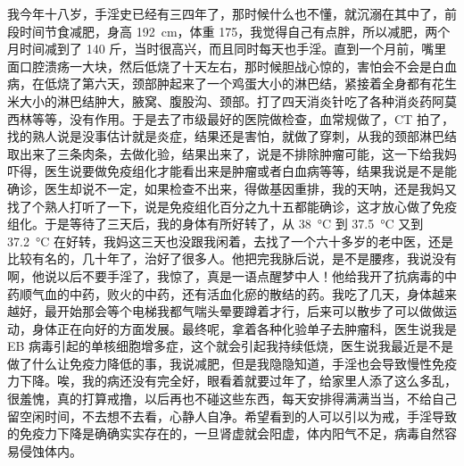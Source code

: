 \begin{case}
    我今年十八岁，手淫史已经有三四年了，那时候什么也不懂，就沉溺在其中了，前段时间节食减肥，身高 \SI{192}{\centi\metre}，体重 175，我觉得自己有点胖，所以减肥，两个月时间减到了 140 斤，当时很高兴，而且同时每天也手淫。直到一个月前，嘴里面口腔溃疡一大块，然后低烧了十天左右，那时候胆战心惊的，害怕会不会是白血病，在低烧了第六天，颈部肿起来了一个鸡蛋大小的淋巴结，紧接着全身都有花生米大小的淋巴结肿大，腋窝、腹股沟、颈部。打了四天消炎针吃了各种消炎药阿莫西林等等，没有作用。于是去了市级最好的医院做检查，血常规做了，CT 拍了，找的熟人说是没事估计就是炎症，结果还是害怕，就做了穿刺，从我的颈部淋巴结取出来了三条肉条，去做化验，结果出来了，说是不排除肿瘤可能，这一下给我妈吓得，医生说要做免疫组化才能看出来是肿瘤或者白血病等等，结果我说是不是能确诊，医生却说不一定，如果检查不出来，得做基因重排，我的天呐，还是我妈又找了个熟人打听了一下，说是免疫组化百分之九十五都能确诊，这才放心做了免疫组化。于是等待了三天后，我的身体有所好转了，从 \SI{38}{\degreeCelsius} 到 \SI{37.5}{\degreeCelsius} 又到 \SI{37.2}{\degreeCelsius} 在好转，我妈这三天也没跟我闲着，去找了一个六十多岁的老中医，还是比较有名的，几十年了，治好了很多人。他把完我脉后说，是不是腰疼，我说没有啊，他说以后不要手淫了，我惊了，真是一语点醒梦中人！他给我开了抗病毒的中药顺气血的中药，败火的中药，还有活血化瘀的散结的药。我吃了几天，身体越来越好，最开始那会等个电梯我都气喘头晕要蹲着才行，后来可以散步了可以做做运动，身体正在向好的方面发展。最终呢，拿着各种化验单子去肿瘤科，医生说我是 EB 病毒引起的单核细胞增多症，这个就会引起我持续低烧，医生说我最近是不是做了什么让免疫力降低的事，我说减肥，但是我隐隐知道，手淫也会导致慢性免疫力下降。唉，我的病还没有完全好，眼看着就要过年了，给家里人添了这么多乱，很羞愧，真的打算戒撸，以后再也不碰这些东西，每天安排得满满当当，不给自己留空闲时间，不去想不去看，心静人自净。希望看到的人可以引以为戒，手淫导致的免疫力下降是确确实实存在的，一旦肾虚就会阳虚，体内阳气不足，病毒自然容易侵蚀体内。


\end{case}
